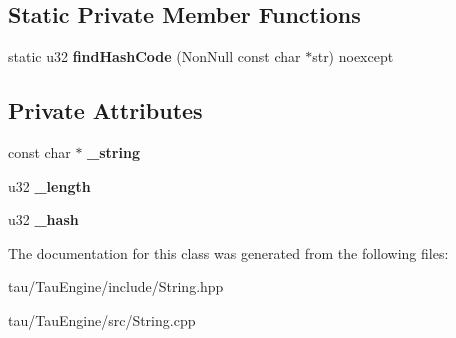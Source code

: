 \subsection*{Static Private Member Functions}
\begin{DoxyCompactItemize}
\item 
\mbox{\label{class_string_ada0c2bbb5447b10a4a4bf52f777bcbda}} 
static u32 {\bfseries find\+Hash\+Code} (Non\+Null const char $\ast$str) noexcept
\end{DoxyCompactItemize}
\subsection*{Private Attributes}
\begin{DoxyCompactItemize}
\item 
\mbox{\label{class_string_a5daeeb0eb9fb5a569e296f59f1e0c6c6}} 
const char $\ast$ {\bfseries \+\_\+string}
\item 
\mbox{\label{class_string_afbd91c4ee8068ee71deb5672bdf98204}} 
u32 {\bfseries \+\_\+length}
\item 
\mbox{\label{class_string_a2cb285b307912ad2ac5cfe700cd11827}} 
u32 {\bfseries \+\_\+hash}
\end{DoxyCompactItemize}


The documentation for this class was generated from the following files\+:\begin{DoxyCompactItemize}
\item 
tau/\+Tau\+Engine/include/String.\+hpp\item 
tau/\+Tau\+Engine/src/String.\+cpp\end{DoxyCompactItemize}
